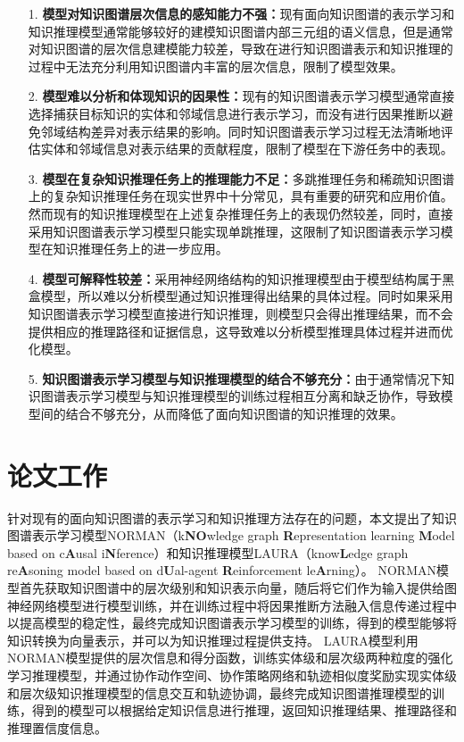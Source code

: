 \documentclass[algorithmlist, AutoFakeBold, AutoFakeSlant, figurelist, tablelist, nomlist, engineering]{seuthesix}
\begin{document}
\begin{itemize}
  \item [1.]\textbf{模型对知识图谱层次信息的感知能力不强：}现有面向知识图谱的表示学习和知识推理模型通常能够较好的建模知识图谱内部三元组的语义信息，但是通常对知识图谱的层次信息建模能力较差，导致在进行知识图谱表示和知识推理的过程中无法充分利用知识图谱内丰富的层次信息，限制了模型效果。
  \item [2.]\textbf{模型难以分析和体现知识的因果性：}现有的知识图谱表示学习模型通常直接选择捕获目标知识的实体和邻域信息进行表示学习，而没有进行因果推断以避免邻域结构差异对表示结果的影响。同时知识图谱表示学习过程无法清晰地评估实体和邻域信息对表示结果的贡献程度，限制了模型在下游任务中的表现。
  \item [3.]\textbf{模型在复杂知识推理任务上的推理能力不足：}多跳推理任务和稀疏知识图谱上的复杂知识推理任务在现实世界中十分常见，具有重要的研究和应用价值。然而现有的知识推理模型在上述复杂推理任务上的表现仍然较差，同时，直接采用知识图谱表示学习模型只能实现单跳推理，这限制了知识图谱表示学习模型在知识推理任务上的进一步应用。
  \item [4.]\textbf{模型可解释性较差：}采用神经网络结构的知识推理模型由于模型结构属于黑盒模型，所以难以分析模型通过知识推理得出结果的具体过程。同时如果采用知识图谱表示学习模型直接进行知识推理，则模型只会得出推理结果，而不会提供相应的推理路径和证据信息，这导致难以分析模型推理具体过程并进而优化模型。
  \item [5.]\textbf{知识图谱表示学习模型与知识推理模型的结合不够充分：}由于通常情况下知识图谱表示学习模型与知识推理模型的训练过程相互分离和缺乏协作，导致模型间的结合不够充分，从而降低了面向知识图谱的知识推理的效果。
\end{itemize}

\section{论文工作}
针对现有的面向知识图谱的表示学习和知识推理方法存在的问题，本文提出了知识图谱表示学习模型NORMAN（k\textbf{NO}wledge graph \textbf{R}epresentation learning \textbf{M}odel based on c\textbf{A}usal i\textbf{N}ference）和知识推理模型LAURA（know\textbf{L}edge graph re\textbf{A}soning model based on d\textbf{U}al-agent \textbf{R}einforcement le\textbf{A}rning）。
NORMAN模型首先获取知识图谱中的层次级别和知识表示向量，随后将它们作为输入提供给图神经网络模型进行模型训练，并在训练过程中将因果推断方法融入信息传递过程中以提高模型的稳定性，最终完成知识图谱表示学习模型的训练，得到的模型能够将知识转换为向量表示，并可以为知识推理过程提供支持。
LAURA模型利用NORMAN模型提供的层次信息和得分函数，训练实体级和层次级两种粒度的强化学习推理模型，并通过协作动作空间、协作策略网络和轨迹相似度奖励实现实体级和层次级知识推理模型的信息交互和轨迹协调，最终完成知识图谱推理模型的训练，得到的模型可以根据给定知识信息进行推理，返回知识推理结果、推理路径和推理置信度信息。
\end{document}
